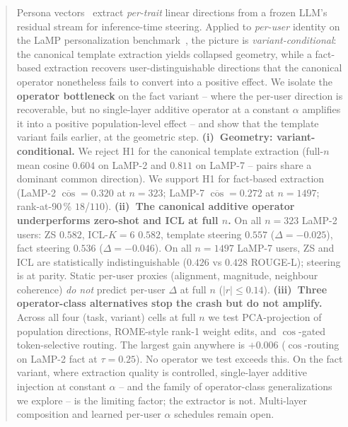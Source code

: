\documentclass{article}
\begin{document}
\begin{abstract}
Persona vectors~\cite{chen2025persona} extract \emph{per-trait} linear
directions from a frozen LLM's residual stream for inference-time
steering.  Applied to \emph{per-user} identity on the LaMP
personalization benchmark~\cite{salemi2024lamp}, the picture is
\emph{variant-conditional}: the canonical template extraction yields
collapsed geometry, while a fact-based extraction recovers
user-distinguishable directions that the canonical operator
nonetheless fails to convert into a positive effect.  We isolate the
\textbf{operator bottleneck} on the fact variant -- where the per-user
direction is recoverable, but no single-layer additive operator at a
constant $\alpha$ amplifies it into a positive population-level
effect -- and show that the template variant fails earlier, at the
geometric step.
\textbf{(i)~Geometry: variant-conditional.}  We reject H1 for the
canonical template extraction (full-$n$ mean cosine $0.604$ on LaMP-2
and $0.811$ on LaMP-7 -- pairs share a dominant common direction).
We support H1 for fact-based extraction (LaMP-2
$\overline{\cos}{=}0.320$ at $n{=}323$; LaMP-7 $\overline{\cos}{=}0.272$
at $n{=}1497$; rank-at-90\,\% $18$/$110$).
\textbf{(ii)~The canonical additive operator underperforms zero-shot
and ICL at full $n$.}  On all $n{=}323$ LaMP-2 users: ZS $0.582$,
ICL-$K{=}6$ $0.582$, template steering $0.557$ ($\Delta{=}{-}0.025$),
fact steering $0.536$ ($\Delta{=}{-}0.046$).  On all $n{=}1497$
LaMP-7 users, ZS and ICL are statistically indistinguishable
($0.426$ vs $0.428$ ROUGE-L); steering is at parity.  Static
per-user proxies (alignment, magnitude, neighbour coherence)
\emph{do not} predict per-user $\Delta$ at full $n$ ($|r|{\le}0.14$).
\textbf{(iii)~Three operator-class alternatives stop the crash but
do not amplify.}  Across all four (task, variant) cells at full $n$
we test PCA-projection of population directions, ROME-style rank-1
weight edits, and $\cos$-gated token-selective routing.  The largest
gain anywhere is $+0.006$ ($\cos$-routing on LaMP-2 fact at
$\tau{=}0.25$).  No operator we test exceeds this.  On the fact variant, where extraction
quality is controlled, single-layer additive injection at constant
$\alpha$ -- and the family of operator-class generalizations we
explore -- is the limiting factor; the extractor is not.  Multi-layer
composition and learned per-user $\alpha$ schedules remain open.
\end{abstract}
\end{document}
